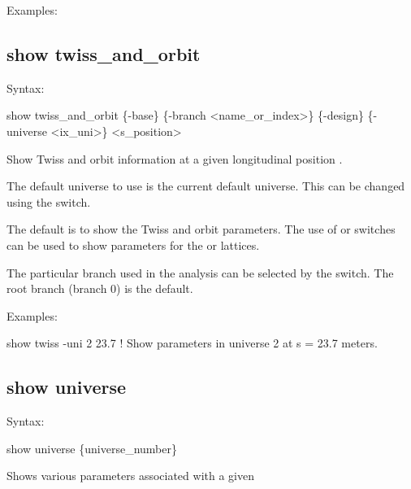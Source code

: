 {{{{{{Examples:


\subsection{show twiss_and_orbit}
\label{s:show.twiss}

Syntax:
\begin{example}
    show twiss_and_orbit \{-base\} \{-branch <name_or_index>\} \{-design\}
    \{-universe <ix_uni>\} <s_position>
\end{example}

Show Twiss and orbit information at a given longitudinal position . 

The default universe to use is the current default universe. This can be changed using the
 switch.

The default is to show the  Twiss and orbit parameters. The use of  or
 switches can be used to show parameters for the  or 
lattices.

The particular branch used in the analysis can be selected by the  switch. The
root branch (branch 0) is the default.

Examples:
\begin{example}
  show twiss -uni 2 23.7     ! Show parameters in universe 2 at s = 23.7 meters.
\end{example} 


\subsection{show universe}
\label{s:show.universe}

Syntax:
\begin{example}
  show universe \{universe_number\}
\end{example}

Shows various parameters associated with a given

}}}}}}
